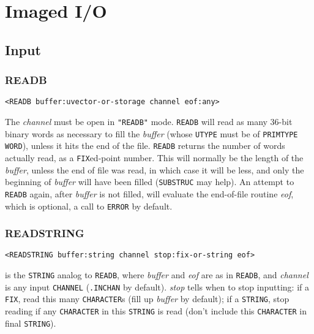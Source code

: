 \documentclass[a4paper]{scrbook}
\begin{document}
\section{Imaged I/O}\label{imaged-io}

\subsection{Input}\label{input-1}

\subsubsection{READB}\label{readb}

\begin{verbatim}
<READB buffer:uvector-or-storage channel eof:any>
\end{verbatim}

 The \emph{channel} must be open in \texttt{"READB"} mode. \texttt{READB} will read as many
36-bit binary words as necessary to fill the \emph{buffer} (whose \texttt{UTYPE} must be of \texttt{PRIMTYPE}
\texttt{WORD}), unless it hits the end of the file. \texttt{READB} returns the number of words actually read, as a
\texttt{FIX}ed-point number. This will normally be the length of the \emph{buffer}, unless the end of file was read, in
which case it will be less, and only the beginning of \emph{buffer} will have been filled (\texttt{SUBSTRUC} may help). An
attempt to \texttt{READB} again, after \emph{buffer} is not filled, will evaluate the end-of-file routine \emph{eof}, which
is optional, a call to \texttt{ERROR} by default.

\subsubsection{READSTRING}\label{readstring}

\begin{verbatim}
<READSTRING buffer:string channel stop:fix-or-string eof>
\end{verbatim}

 is the \texttt{STRING} analog to \texttt{READB}, where \emph{buffer} and \emph{eof} are
as in \texttt{READB}, and \emph{channel} is any input \texttt{CHANNEL} (\texttt{.INCHAN} by default). \emph{stop} tells
when to stop inputting: if a \texttt{FIX}, read this many \texttt{CHARACTER}s (fill up \emph{buffer} by default); if a
\texttt{STRING}, stop reading if any \texttt{CHARACTER} in this \texttt{STRING} is read (don't include this
\texttt{CHARACTER} in final \texttt{STRING}).
\end{document}
